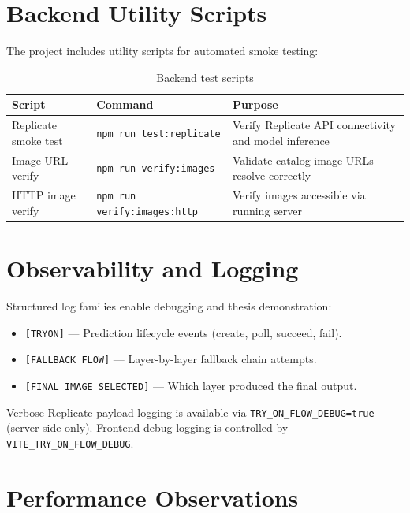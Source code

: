 \section{Backend Utility Scripts}
\label{sec:backend-scripts}

The project includes utility scripts for automated smoke testing:

\begin{table}[H]
  \centering
  \caption{Backend test scripts}
  \label{tab:backend-scripts}
  \begin{tabular}{@{}llp{7cm}@{}}
    \toprule
    \textbf{Script} & \textbf{Command} & \textbf{Purpose} \\
    \midrule
    Replicate smoke test & \texttt{npm run test:replicate} & Verify Replicate API connectivity and model inference \\
    Image URL verify & \texttt{npm run verify:images} & Validate catalog image URLs resolve correctly \\
    HTTP image verify & \texttt{npm run verify:images:http} & Verify images accessible via running server \\
    \bottomrule
  \end{tabular}
\end{table}

\section{Observability and Logging}
\label{sec:observability}

Structured log families enable debugging and thesis demonstration:

\begin{itemize}[leftmargin=*]
  \item \texttt{[TRYON]} --- Prediction lifecycle events (create, poll, succeed, fail).
  \item \texttt{[FALLBACK FLOW]} --- Layer-by-layer fallback chain attempts.
  \item \texttt{[FINAL IMAGE SELECTED]} --- Which layer produced the final output.
\end{itemize}

Verbose Replicate payload logging is available via \texttt{TRY\_ON\_FLOW\_DEBUG=true} (server-side only). Frontend debug logging is controlled by \texttt{VITE\_TRY\_ON\_FLOW\_DEBUG}.

\section{Performance Observations}
\label{sec:performance}

